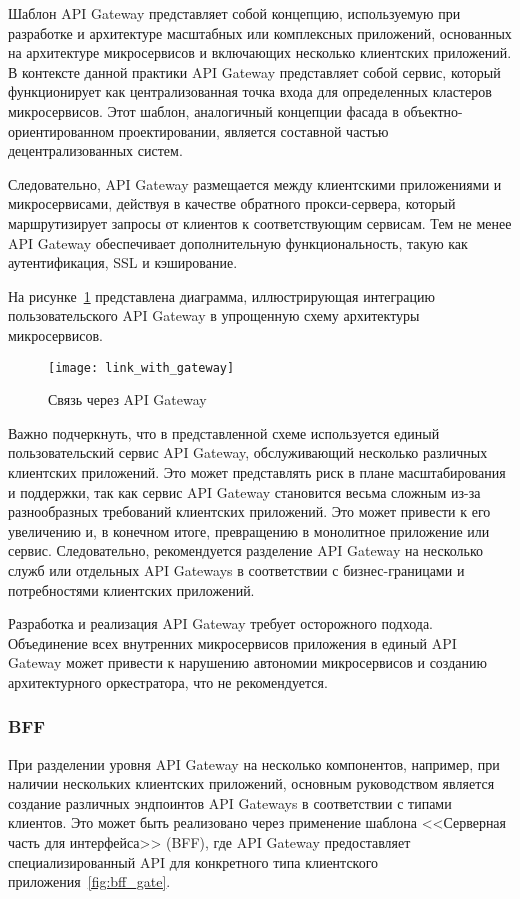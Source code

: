 Шаблон API Gateway представляет собой концепцию, используемую при разработке и архитектуре
масштабных или комплексных приложений, основанных на архитектуре микросервисов и включающих
несколько клиентских приложений.
В контексте данной практики API Gateway представляет собой сервис,
который функционирует как централизованная точка входа для определенных кластеров микросервисов.
Этот шаблон, аналогичный концепции фасада в объектно-ориентированном проектировании, является
составной частью децентрализованных систем.

Следовательно, API Gateway размещается между клиентскими приложениями и микросервисами, действуя в
качестве обратного прокси-сервера, который маршрутизирует запросы от клиентов к соответствующим
сервисам.
Тем не менее API Gateway обеспечивает дополнительную функциональность, такую как
аутентификация, SSL и кэширование.

На рисунке~\ref{fig:link_with_gate} представлена диаграмма, иллюстрирующая интеграцию
пользовательского
API Gateway в упрощенную схему архитектуры микросервисов.

\begin{figure}[htbp]
    \centering
    \texttt{[image: link\_with\_gateway]}
    \caption{Связь через API Gateway}
    \label{fig:link_with_gate}
\end{figure}

Важно подчеркнуть, что в представленной схеме используется единый пользовательский сервис API
Gateway, обслуживающий несколько различных клиентских приложений.
Это может представлять риск в
плане масштабирования и поддержки, так как сервис API Gateway становится весьма сложным из-за
разнообразных требований клиентских приложений.
Это может привести к его увеличению и, в конечном
итоге, превращению в монолитное приложение или сервис.
Следовательно, рекомендуется разделение API
Gateway на несколько служб или отдельных API Gateways в соответствии с бизнес-границами и
потребностями клиентских приложений.

Разработка и реализация API Gateway требует осторожного подхода.
Объединение всех внутренних
микросервисов приложения в единый API Gateway может привести к нарушению автономии микросервисов и
созданию архитектурного оркестратора, что не рекомендуется.

\subsubsection{BFF}

При разделении уровня API Gateway на несколько компонентов, например, при наличии нескольких
клиентских приложений, основным руководством является создание различных эндпоинтов API Gateways в
соответствии
с типами клиентов.
Это может быть реализовано через применение шаблона <<Серверная часть для
интерфейса>> (BFF), где API Gateway предоставляет специализированный API для конкретного типа
клиентского приложения~\ref{fig:bff_gate}.

